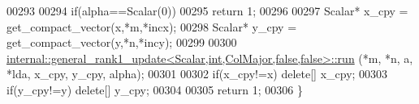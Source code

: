\begin{DoxyCode}
00293 
00294   \textcolor{keywordflow}{if}(alpha==Scalar(0))
00295     \textcolor{keywordflow}{return} 1;
00296 
00297   Scalar* x\_cpy = get\_compact\_vector(x,*m,*incx);
00298   Scalar* y\_cpy = get\_compact\_vector(y,*n,*incy);
00299 
00300   \hyperlink{structinternal_1_1general__rank1__update}{internal::general\_rank1\_update<Scalar,int,ColMajor,false,false>::run}
      (*m, *n, a, *lda, x\_cpy, y\_cpy, alpha);
00301 
00302   \textcolor{keywordflow}{if}(x\_cpy!=x)  \textcolor{keyword}{delete}[] x\_cpy;
00303   \textcolor{keywordflow}{if}(y\_cpy!=y)  \textcolor{keyword}{delete}[] y\_cpy;
00304 
00305   \textcolor{keywordflow}{return} 1;
00306 \}
\end{DoxyCode}
